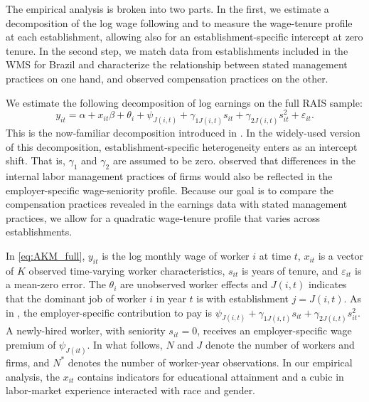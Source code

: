 
The empirical analysis is broken into two parts. In the first, we estimate a decomposition of the log wage following \citet{Abowd1999} and \citet{abowd2002} to measure the wage-tenure profile at each establishment, allowing also for an establishment-specific intercept at zero tenure. In the second step, we match data from establishments included in the WMS for Brazil and characterize the relationship between stated management practices on one hand, and observed compensation practices on the other.

	We estimate the following decomposition of log earnings on the full RAIS sample:
		\begin{equation}
		\label{eq:AKM_full}
		y_{it} = \alpha + x_{it}\beta + \theta_i +\psi_{J(i,t)} +\gamma_{1J(i,t)}s_{it} +\gamma_{2J(i,t)}s_{it}^2 + \varepsilon_{it}.
		\end{equation}
	\noindent
	This is the now-familiar decomposition introduced in \citet{Abowd1999}. In the widely-used version of this decomposition, establishment-specific heterogeneity enters as an intercept shift. That is, $\gamma_{1}$ and $\gamma_{2}$ are assumed to be zero. \citet{Abowd1999} observed that differences in the internal labor management practices of firms would also be reflected in the employer-specific wage-seniority profile. Because our goal is to compare the compensation practices revealed in the earnings data with stated management practices, we allow for a quadratic wage-tenure profile that varies across establishments.

	In  \ref{eq:AKM_full}, $y_{it}$ is the log monthly wage of worker $i$ at time $t$, $x_{it}$ is a vector of $K$ observed time-varying worker characteristics, $s_{it}$ is years of tenure, and $\varepsilon_{it}$ is a mean-zero error. The $\theta_i$  are unobserved worker effects and $J(i,t)$ indicates that the dominant job of worker $i$ in year $t$ is with establishment $j=J(i,t)$. As in \citet{Abowd1999}, the employer-specific contribution to pay is $\psi_{J(i,t)} +\gamma_{1J(i,t)}s_{it} +\gamma_{2J(i,t)}s_{it}^2$. A newly-hired worker, with seniority $s_{it}=0$, receives an employer-specific wage premium of $\psi_{J(it)}$. In what follows, $N$ and $J$ denote the number of workers and firms, and $N^*$ denotes the number of worker-year observations. In our empirical analysis, the $x_{it}$ contains indicators for educational attainment and a cubic in labor-market experience interacted with race and gender.

